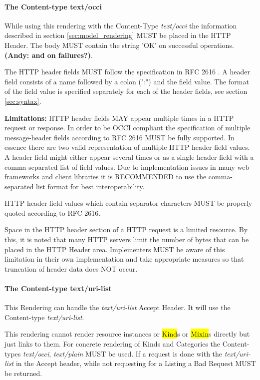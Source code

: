 \documentclass[10pt,a4paper]{article}
\begin{document}
\paragraph{The Content-type text/occi}
While using this rendering with the Content-Type \textit{text/occi}
the information described in section \ref{sec:model_rendering} MUST be
placed in the HTTP Header. The body MUST contain the string 'OK' on
successful operations. \textbf{(Andy: and on failures?)}.

The HTTP header fields MUST follow the specification in RFC 2616
\cite{rfc2616}. A header field consists of a name followed by a colon
(":") and the field value. The format of the field value is specified
separately for each of the header fields, see section
\ref{sec:syntax}.

\textbf{Limitations: } HTTP header fields MAY appear multiple times in
a HTTP request or response. In order to be OCCI compliant the
specification of multiple message-header fields according to RFC 2616
MUST be fully supported. In essence there are two valid representation
of multiple HTTP header field values. A header field might either
appear several times or as a single header field with a
comma-separated list of field values. Due to implementation issues in
many web frameworks and client libraries it is RECOMMENDED to use the
comma-separated list format for best interoperability.

HTTP header field values which contain separator characters MUST be
properly quoted according to RFC 2616.

Space in the HTTP header section of a HTTP request is a limited
resource. By this, it is noted that many HTTP servers limit the number
of bytes that can be placed in the HTTP Header area. Implementers MUST
be aware of this limitation in their own implementation and take
appropriate measures so that truncation of header data does NOT
occur.

\paragraph{The Content-type text/uri-list}
This Rendering can handle the \textit{text/uri-list} Accept Header. It
will use the Content-type \textit{text/uri-list}.

This rendering cannot render resource instances or \hl{Kind}s or
\hl{Mixin}s directly but just links to them. For concrete rendering of
Kinds and Categories the Content-types \textit{text/occi},
\textit{text/plain} MUST be used. If a request is done with the
\textit{text/uri-list} in the Accept header, while not requesting for
a Listing a Bad Request MUST be returned.
\end{document}
